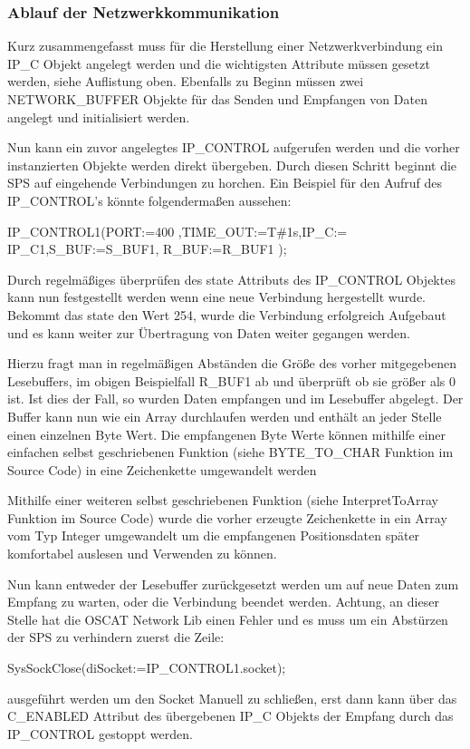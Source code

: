 \subsubsection{Ablauf der Netzwerkkommunikation}
Kurz zusammengefasst muss für die Herstellung einer Netzwerkverbindung ein IP\_C Objekt angelegt werden und die wichtigsten Attribute müssen gesetzt werden, siehe Auflistung oben.
Ebenfalls zu Beginn müssen zwei NETWORK\_BUFFER Objekte für das Senden und Empfangen von Daten angelegt und initialisiert werden.

Nun kann ein zuvor angelegtes IP\_CONTROL aufgerufen werden und die vorher instanzierten Objekte werden direkt übergeben. Durch diesen Schritt beginnt die SPS auf eingehende Verbindungen zu horchen.
Ein Beispiel für den Aufruf des IP\_CONTROL's könnte folgendermaßen aussehen:

IP\_CONTROL1(PORT:=400 ,TIME\_OUT:=T\#1s,IP\_C:= IP\_C1,S\_BUF:=S\_BUF1, R\_BUF:=R\_BUF1 );

Durch regelmäßiges überprüfen des state Attributs des IP\_CONTROL Objektes kann nun festgestellt werden wenn eine neue Verbindung hergestellt wurde. Bekommt das state den Wert 254, wurde die Verbindung erfolgreich Aufgebaut und es kann weiter zur Übertragung von Daten weiter gegangen werden.

Hierzu fragt man in regelmäßigen Abständen die Größe des vorher mitgegebenen Lesebuffers, im obigen Beispielfall R\_BUF1 ab und überprüft ob sie größer als 0 ist. Ist dies der Fall, so wurden Daten empfangen und im Lesebuffer abgelegt. Der Buffer kann nun wie ein Array durchlaufen werden und enthält an jeder Stelle einen einzelnen Byte Wert. Die empfangenen Byte Werte können mithilfe einer einfachen selbst geschriebenen Funktion (siehe BYTE\_TO\_CHAR Funktion im Source Code) in eine Zeichenkette umgewandelt werden

Mithilfe einer weiteren selbst geschriebenen Funktion (siehe InterpretToArray Funktion im Source Code) wurde die vorher erzeugte Zeichenkette in ein Array vom Typ Integer umgewandelt um die empfangenen Positionsdaten später komfortabel auslesen und Verwenden zu können.

Nun kann entweder der Lesebuffer zurückgesetzt werden um auf neue Daten zum Empfang zu warten, oder die Verbindung beendet werden. Achtung, an dieser Stelle hat die OSCAT Network Lib einen Fehler und es muss um ein Abstürzen der SPS zu verhindern zuerst die Zeile:

SysSockClose(diSocket:=IP\_CONTROL1.socket);

ausgeführt werden um den Socket Manuell zu schließen, erst dann kann über das C\_ENABLED Attribut des übergebenen IP\_C Objekts der Empfang durch das IP\_CONTROL gestoppt werden.